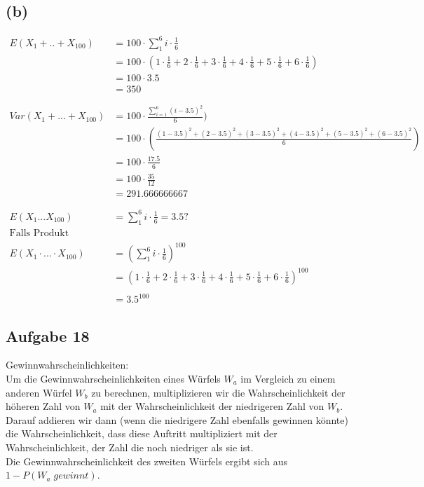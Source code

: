 \documentclass[a4paper]{scrartcl}
\begin{document}
\subsection*{(b)}
\begin{align*}
	E(X_1 + .. + X_{100}) &= 100 \cdot \sum_{1}^{6} i \cdot \frac{1}{6}\\
	& = 100 \cdot (1 \cdot \frac{1}{6} + 2 \cdot \frac{1}{6} + 3\cdot \frac{1}{6} + 4 \cdot \frac{1}{6} + 5 \cdot \frac{1}{6} + 6\cdot \frac{1}{6})\\
	& = 100 \cdot 3.5\\
	& = 350\\
	\\
	\\
	Var(X_1 + ... + X_{100}) & = 100 \cdot \frac{\sum_{i=1}^{6}(i-3.5)^2}{6})\\
	& = 100 \cdot (\frac{(1-3.5)^2 + (2-3.5)^2 + (3-3.5)^2 + (4-3.5)^2 + (5-3.5)^2 + (6-3.5)^2}{6})\\
	& = 100 \cdot \frac{17.5}{6}\\
	& = 100 \cdot \frac{35}{12}\\
	& =  291.666666667\\
	\\
	\\
	E(X_1 ... X_{100}) &= \sum_{1}^{6} i \cdot \frac{1}{6} = 3.5?\\
	\text{Falls Produkt gemeint ist: }&\\
	E(X_1 \cdot ... \cdot X_{100}) &= (\sum_{1}^{6} i \cdot \frac{1}{6})^{100}\\
	& = (1 \cdot \frac{1}{6} + 2 \cdot \frac{1}{6} + 3\cdot \frac{1}{6} + 4 \cdot \frac{1}{6} + 5 \cdot \frac{1}{6} + 6\cdot \frac{1}{6})^{100}\\ \\
	& = 3.5^{100}
\end{align*} 









\subsection*{Aufgabe 18}
Gewinnwahrscheinlichkeiten:\\
Um die Gewinnwahrscheinlichkeiten eines Würfels $W_a$ im Vergleich zu einem anderen Würfel $W_b$ zu berechnen, multiplizieren wir die Wahrscheinlichkeit der höheren Zahl von $W_a$ mit der Wahrscheinlichkeit der niedrigeren Zahl von $W_b$. Darauf addieren wir dann (wenn die niedrigere Zahl ebenfalls gewinnen könnte) die Wahrscheinlichkeit, dass diese Auftritt multipliziert mit der Wahrscheinlichkeit, der Zahl die noch niedriger als sie ist.\\
Die Gewinnwahrscheinlichkeit des zweiten Würfels ergibt sich aus $1-P(W_a\;gewinnt)$.\\
\end{document}
